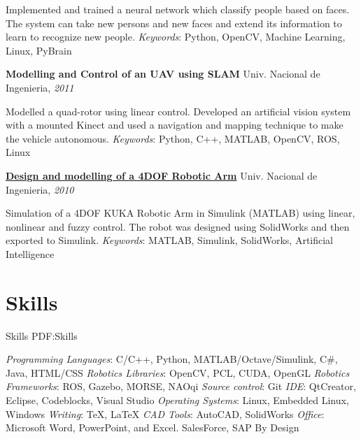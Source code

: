 \documentclass[letterpaper,MMMyyyy,nonstop]{simpleresumecv}
\begin{document}
\begin{body}
\GapNoBreak
\BulletItem
Implemented and trained a neural network which classify people based on faces. The system can take new persons and new faces and extend its information to learn to recognize new people.
\GapNoBreak
\textit{Keywords}: Python, OpenCV, Machine Learning, Linux, PyBrain

\BigGap
\textbf{Modelling and Control of an UAV using SLAM}
\hfill
Univ. Nacional de Ingenieria, \textit{2011}

\GapNoBreak
\BulletItem
Modelled a quad-rotor using linear control. Developed an artificial vision system with a mounted Kinect and used a navigation and mapping technique to make the vehicle autonomous.
\GapNoBreak
\textit{Keywords}: Python, C++, MATLAB, OpenCV, ROS, Linux

\BigGap
\href{https://github.com/davidlavy88/resume/blob/master/Paper/paper-mt-517.pdf}
{\textbf{Design and modelling of a 4DOF Robotic Arm}}
\hfill
Univ. Nacional de Ingenieria, \textit{2010}

\GapNoBreak
\BulletItem
Simulation of a 4DOF KUKA Robotic Arm in Simulink (MATLAB) using linear, nonlinear and fuzzy control. The robot was designed using SolidWorks and then exported to Simulink.
\GapNoBreak
\textit{Keywords}: MATLAB, Simulink, SolidWorks, Artificial Intelligence

%


\section
{Skills}
{Skills}
{PDF:Skills}

\GapNoBreak
\BulletItem
\textit{Programming Languages}: C/C++, Python, MATLAB/Octave/Simulink, C\#, Java, HTML/CSS
\BulletItem
\textit{Robotics Libraries}: OpenCV, PCL, CUDA, OpenGL
\BulletItem
\textit{Robotics Frameworks}: ROS, Gazebo, MORSE, NAOqi
\BulletItem
\textit{Source control}: Git
\BulletItem
\textit{IDE}: QtCreator, Eclipse, Codeblocks, Visual Studio
\BulletItem
\textit{Operating Systems}: Linux, Embedded Linux, Windows
\BulletItem
\textit{Writing}: {\TeX}, {\LaTeX}
\BulletItem
\textit{CAD Tools}: AutoCAD, SolidWorks
\BulletItem
\textit{Office}: Microsoft Word, PowerPoint, and Excel. SalesForce, SAP By Design



\end{body}
\end{document}
